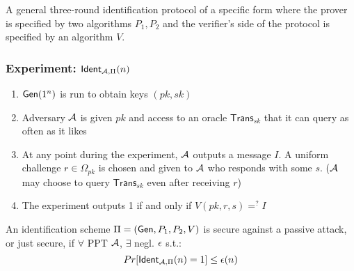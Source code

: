 \documentclass[12pt]{article}
\begin{document}

A general three-round identification protocol of a specific form where the prover is specified by two algorithms $P_1,P_2$ and the verifier's side of the protocol is specified by an algorithm $V$.
\newpage
\subsubsection{Experiment: $\mathsf{Ident}_{\mathcal{A},\Pi}(n)$}
\begin{enumerate}
	\item $\operatorname{\mathsf{Gen}}(1^n)$ is run to obtain keys $(pk,sk)$
	\item Adversary $\mathcal{A}$ is given $pk$ and access to an oracle $\mathsf{Trans}_{sk}$ that it can query as often as it likes
	\item At any point during the experiment, $\mathcal{A}$ outputs a message $I$. A uniform challenge $r \in \Omega_{pk}$ is chosen and given to $\mathcal{A}$ who responds with some $s$. ($\mathcal{A}$ may choose to query $\mathsf{Trans}_{sk}$ even after receiving $r$)
	\item The experiment outputs 1 if and only if $V(pk,r,s)=^? I$ 
\end{enumerate}

An identification scheme $\Pi = (\operatorname{\mathsf{Gen}}, P_1,P_2,V)$ is secure against a passive attack, or just secure, if $\forall$ PPT $\mathcal{A}$, $\exists$ negl. $\epsilon$ s.t.:
\begin{equation*}
	Pr[\mathsf{Ident}_{\mathcal{A},\Pi}(n)=1] \le \epsilon(n)
\end{equation*}
\end{document}
